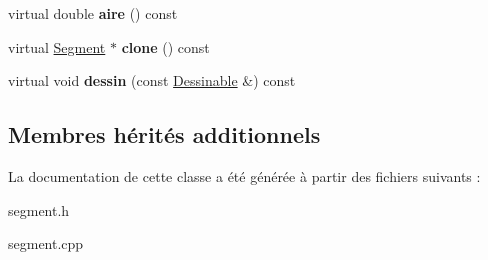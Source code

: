 \begin{DoxyCompactItemize}
\item 
\hypertarget{class_segment_a059d934ffa8d7427f16beb79ce8d794f}{virtual double {\bfseries aire} () const }\label{class_segment_a059d934ffa8d7427f16beb79ce8d794f}

\item 
\hypertarget{class_segment_ab664920d9164e81e5817b29ffc41d411}{virtual \hyperlink{class_segment}{Segment} $\ast$ {\bfseries clone} () const }\label{class_segment_ab664920d9164e81e5817b29ffc41d411}

\item 
\hypertarget{class_segment_a35991f2c6c2cb0db2a64802e3fd09984}{virtual void {\bfseries dessin} (const \hyperlink{class_dessinable}{Dessinable} \&) const }\label{class_segment_a35991f2c6c2cb0db2a64802e3fd09984}

\end{DoxyCompactItemize}
\subsection*{Membres hérités additionnels}


La documentation de cette classe a été générée à partir des fichiers suivants \+:\begin{DoxyCompactItemize}
\item 
segment.\+h\item 
segment.\+cpp\end{DoxyCompactItemize}
